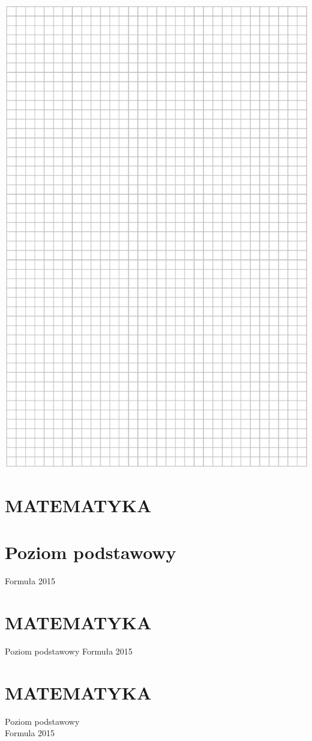 \documentclass[10pt]{article}
\begin{document}
\includegraphics[max width=\textwidth, center]{2024_11_21_0a35d272448d5080a489g-31}

\section*{MATEMATYKA}
\section*{Poziom podstawowy}
Formuła 2015

\section*{MATEMATYKA}
Poziom podstawowy Formuła 2015

\section*{MATEMATYKA}
Poziom podstawowy\\
Formula 2015
\end{document}
